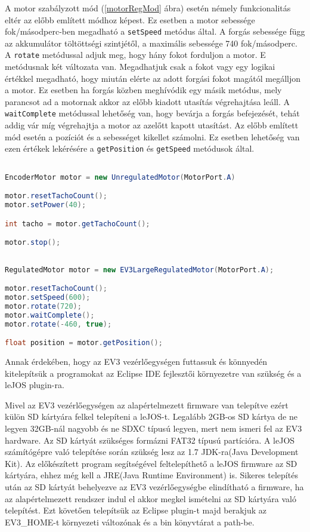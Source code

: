 A motor szabályzott mód (\ref{motorRegMod} ábra) esetén némely funkcionalitás eltér az előbb említett módhoz képest. Ez esetben a motor sebessége fok/másodperc-ben megadható a \texttt{setSpeed} metódus által. A forgás sebessége függ az akkumulátor töltöttségi szintjétől, a maximális sebessége 740 fok/másodperc. A \texttt{rotate} metódussal adjuk meg, hogy hány fokot forduljon a motor. E metódusnak két változata van. Megadhatjuk csak a fokot vagy egy logikai értékkel megadható, hogy miután elérte az adott forgási fokot magától megálljon a motor. Ez esetben ha forgás közben meghívódik egy másik metódus, mely parancsot ad a motornak akkor az előbb kiadott utasítás végrehajtása leáll. A \texttt{waitComplete} metódussal lehetőség van, hogy bevárja a forgás befejezését, tehát addig vár míg végrehajtja a motor az azelőtt kapott utasítást. Az előbb említett mód esetén a pozíciót és a sebességet kikellet számolni. Ez esetben lehetőség van ezen értékek lekérésére a \texttt{getPosition} és \texttt{getSpeed} metódusok által.

\begin{lstlisting}[label=motorUnregMod, caption=  A nagy motor \texttt{regulated} mód használata, language=Java]

EncoderMotor motor = new UnregulatedMotor(MotorPort.A)

motor.resetTachoCount();
motor.setPower(40);

int tacho = motor.getTachoCount();

motor.stop();

\end{lstlisting}

\begin{lstlisting}[label=motorRegMod, caption= A nagy motor \texttt{unregulated} mód használata, language=Java]

RegulatedMotor motor = new EV3LargeRegulatedMotor(MotorPort.A);

motor.resetTachoCount();
motor.setSpeed(600);
motor.rotate(720);
motor.waitComplete();
motor.rotate(-460, true);

float position = motor.getPosition();

\end{lstlisting}

Annak érdekében, hogy az EV3 vezérlőegységen futtassuk és könnyedén kitelepítsük a programokat az Eclipse IDE fejlesztői környezetre van szükség és a leJOS plugin-ra.

Mivel az EV3 vezérlőegységen az alapértelmezett firmware van telepítve ezért külön SD kártyára felkel telepíteni a leJOS-t. Legalább 2GB-os SD kártya de ne legyen 32GB-nál nagyobb és ne SDXC típusú legyen, mert nem ismeri fel az EV3 hardware. Az SD kártyát szükséges formázni FAT32 típusú partícióra. A leJOS számítógépre való telepítése során szükség lesz az 1.7 JDK-ra(Java Development Kit). Az előkészített program segítségével feltelepíthető a leJOS firmware az SD kártyára, ehhez még kell a JRE(Java Runtime Environment) is. Sikeres telepítés után az SD kártyát behelyezve az EV3 vezérlőegységbe elindítható a firmware, ha az alapértelmezett rendszer indul el akkor megkel ismételni az SD kártyára való telepítést. Ezt követően telepítsük az Eclipse plugin-t majd berakjuk az EV3\_HOME-t környezeti változónak és a bin könyvtárat a path-be.

